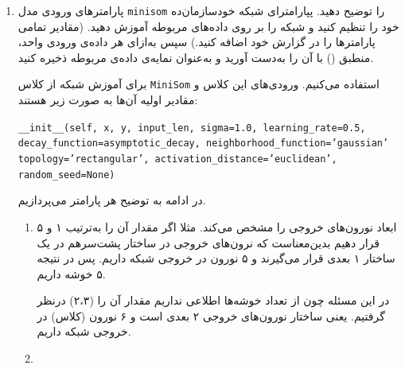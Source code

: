 \begin{enumerate}
\begin{qsolve}
	 	
	\end{qsolve}
	 	
	 	
	 	
	 	
	 	\item پارامتر‌های ورودی مدل \texttt{minisom} را توضیح دهید. پپارامترای شبکه خودسازمان‌ده خود را تنظیم کنید و شبکه را بر روی داده‌های مربوطه آموزش دهید. (مقادیر تمامی پارامتر‌ها را در گزارش خود اضافه کنید.) سپس به‌ازای هر داده‌ی ورودی واحد، منطبق () با آن را به‌دست آورید و به‌عنوان نمایه‌ی داده‌ی مربوطه ذخیره کنید.
	 	
	 	
	 \begin{qsolve}
	 	برای آموزش شبکه از کلاس \texttt{MiniSom} استفاده می‌کنیم. ورودی‌های این کلاس و مقادیر اولیه آن‌ها به صورت زیر هستند:
	 	
	 	\begin{latin}
	 		\texttt{\_\_init\_\_(self, x, y, input\_len, sigma=1.0, learning\_rate=0.5,}\\
	 		\texttt{decay\_function=asymptotic\_decay, neighborhood\_function='gaussian'}\\
	 		\texttt{topology='rectangular', activation\_distance='euclidean', random\_seed=None)}
	 	\end{latin}
	 	
	 	در ادامه به توضیح هر پارامتر می‌پردازیم.
	 \end{qsolve}
	 	
	 	
	 	
	 	
	 	
	 	
	 	
	 	
	 	
	 \begin{qsolve}
	 	
	 	\begin{enumerate}
	 		\item {}
	 	
	 		 ابعاد نورون‌های خروجی را مشخص می‌کند. مثلا اگر مقدار آن را به‌ترتیب ۱ و ۵ قرار دهیم بدین‌معناست که نرون‌های خروجی در ساختار پشت‌سر‌هم  در یک ساختار ۱ بعدی قرار می‌گیرند و ۵ نورون در خروجی شبکه داریم. پس در نتیجه ۵ خوشه داریم.
	 		
در این مسئله چون از تعداد خوشه‌ها اطلاعی نداریم مقدار آن را (۲،۳) درنظر گرفتیم. یعنی ساختار نورون‌های خروجی ۲ بعدی است و ۶ نورون (کلاس) در خروجی شبکه داریم.
	 		
	 		
	 		
	 		\item {}
	 		

\end{enumerate}
\end{qsolve}
\end{enumerate}
